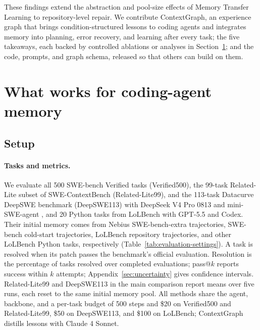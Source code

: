 \documentclass{article}
\begin{document}
These findings extend the abstraction and pool-size effects of Memory
Transfer Learning \citep{transfer2026} to repository-level repair. We
contribute ContextGraph, an experience graph that brings condition-structured
lessons \citep{clin2023,autoguide2024} to coding agents and integrates memory
into planning, error recovery, and learning after every task; the five
takeaways, each backed by controlled ablations or analyses in
Section~\ref{sec:experiments}; and the code, prompts, and graph schema,
released so that others can build on them.
\endgroup




\section{What works for coding-agent memory}
\label{sec:experiments}
\label{sec:recorded-results}

\subsection{Setup}
\label{sec:setup}
\paragraph{Tasks and metrics.}
We evaluate all 500 SWE-bench Verified tasks (Verified500), the 99-task
Related-Lite subset of SWE-ContextBench (Related-Lite99), and the 113-task
Datacurve DeepSWE benchmark (DeepSWE113)
\citep{swebench2024,swecontext2026,deepswe2026} with DeepSeek V4 Pro 0813
and mini-SWE-agent \citep{minisweagent2025,sweagent2024}, and 20 Python tasks
from LoLBench \citep{lolbench2026} with GPT-5.5 and Codex. Their initial
memory comes from Nebius SWE-bench-extra trajectories, SWE-bench cold-start
trajectories, LoLBench repository trajectories, and other LoLBench Python
tasks, respectively (Table~\ref{tab:evaluation-settings}). A task is resolved when
its patch passes the benchmark's official evaluation. Resolution is the
percentage of tasks resolved over completed evaluations; pass@$k$ reports
success within $k$ attempts; Appendix~\ref{sec:uncertainty} gives confidence
intervals. Related-Lite99 and DeepSWE113 in the main comparison report means
over five runs, each reset to the same initial memory pool. All methods share
the agent, backbone, and a per-task budget of 500 steps and \$20 on
Verified500 and Related-Lite99, \$50 on DeepSWE113, and \$100 on LoLBench;
ContextGraph distills lessons with Claude 4 Sonnet.
\end{document}
